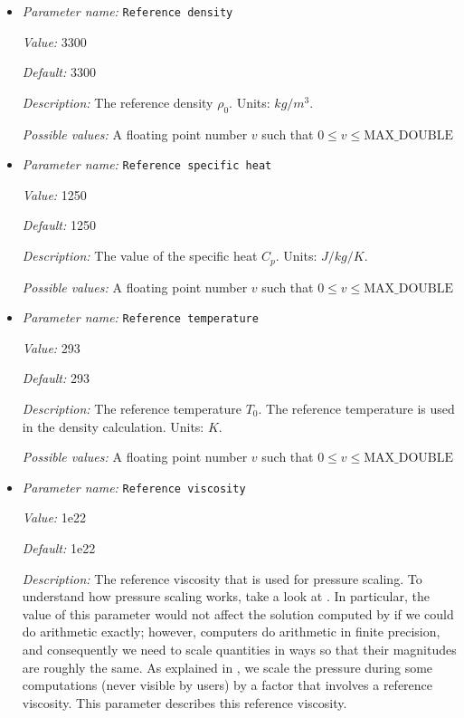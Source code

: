 \begin{itemize}
\item {\it Parameter name:} {\tt Reference density}
\label{parameters:Material model/Drucker Prager/Reference density}


{\it Value:} 3300


{\it Default:} 3300


{\it Description:} The reference density $\rho_0$. Units: $kg/m^3$.


{\it Possible values:} A floating point number $v$ such that $0 \leq v \leq \text{MAX\_DOUBLE}$
\item {\it Parameter name:} {\tt Reference specific heat}
\label{parameters:Material model/Drucker Prager/Reference specific heat}


{\it Value:} 1250


{\it Default:} 1250


{\it Description:} The value of the specific heat $C_p$. Units: $J/kg/K$.


{\it Possible values:} A floating point number $v$ such that $0 \leq v \leq \text{MAX\_DOUBLE}$
\item {\it Parameter name:} {\tt Reference temperature}
\label{parameters:Material model/Drucker Prager/Reference temperature}


{\it Value:} 293


{\it Default:} 293


{\it Description:} The reference temperature $T_0$. The reference temperature is used in the density calculation. Units: $K$.


{\it Possible values:} A floating point number $v$ such that $0 \leq v \leq \text{MAX\_DOUBLE}$
\item {\it Parameter name:} {\tt Reference viscosity}
\label{parameters:Material model/Drucker Prager/Reference viscosity}


{\it Value:} 1e22


{\it Default:} 1e22


{\it Description:} The reference viscosity that is used for pressure scaling. To understand how pressure scaling works, take a look at \cite{KHB12}. In particular, the value of this parameter would not affect the solution computed by \aspect{} if we could do arithmetic exactly; however, computers do arithmetic in finite precision, and consequently we need to scale quantities in ways so that their magnitudes are roughly the same. As explained in \cite{KHB12}, we scale the pressure during some computations (never visible by users) by a factor that involves a reference viscosity. This parameter describes this reference viscosity.


\end{itemize}

